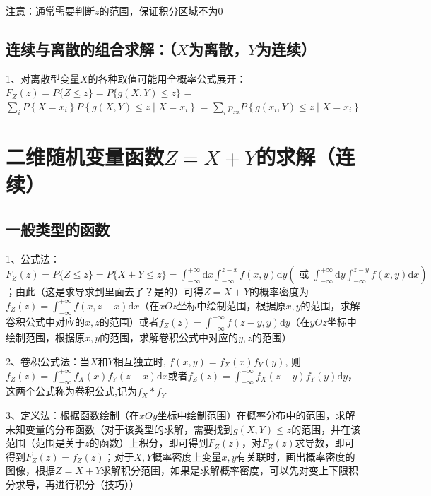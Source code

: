 注意：通常需要判断$z$的范围，保证积分区域不为0



\subsection{连续与离散的组合求解：（$X$为离散，$Y$为连续）}

1、对离散型变量$X$的各种取值可能用全概率公式展开：$F_{Z}(z)=P\{Z \leqslant z\}=P\{g(X, Y) \leqslant z\}$ = $\sum_{i} P\left\{X=x_{i}\right\} P\left\{g(X, Y) \leqslant z \mid X=x_{i}\right\}$ = $\sum_{i} p_{xi} P\left\{g\left(x_{i}, Y\right) \leqslant z \mid X=x_{i}\right\}$

\section{二维随机变量函数$Z=X+Y$的求解（连续）}



\subsection{一般类型的函数}

1、公式法：$F_{Z}(z)=P\{Z \leqslant z\}=P\{X+Y \leqslant z\}=\int_{-\infty}^{+\infty} \mathrm{d} x \int_{-\infty}^{z-x} f(x, y) \mathrm{d} y\left(\text { 或 } \int_{-\infty}^{+\infty} \mathrm{d} y \int_{-\infty}^{z-y} f(x, y) \mathrm{d} x\right)$；由此（这是求导求到里面去了？是的）可得$Z=X+Y$的概率密度为$f_{Z}(z)=\int_{-\infty}^{+\infty} f(x, z-x) \mathrm{d} x$（在$xOz$坐标中绘制范围，根据原$x,y$的范围，求解卷积公式中对应的$x,z$的范围）或者$f_{Z}(z)=\int_{-\infty}^{+\infty} f(z-y, y) \mathrm{d} y$（在$yOz$坐标中绘制范围，根据原$x,y$的范围，求解卷积公式中对应的$y,z$的范围）

2、卷积公式法：当$X$和$Y$相互独立时, $f(x, y)=f_{X}(x) f_{Y}(y)$, 则$f_{Z}(z)=\int_{-\infty}^{+\infty} f_{X}(x) f_{Y}(z-x) \mathrm{d} x$或者$f_{Z}(z)=\int_{-\infty}^{+\infty} f_{X}(z-y) f_{Y}(y) \mathrm{d} y$，这两个公式称为卷积公式,记为$f_{X} * f_{Y}$

3、定义法：根据函数绘制（在$xOy$坐标中绘制范围）在概率分布中的范围，求解未知变量的分布函数（对于该类型的求解，需要找到$g(X, Y) \leqslant z$的范围，并在该范围（范围是关于$z$的函数）上积分，即可得到$F_{Z}(z)$，对$F_{Z}(z)$求导数，即可得到$F_{Z}^{'}(z)=f_{Z}(z)$；对于$X,Y$概率密度上变量$x,y$有关联时，画出概率密度的图像，根据$Z=X+Y$求解积分范围，如果是求解概率密度，可以先对变上下限积分求导，再进行积分（技巧））

